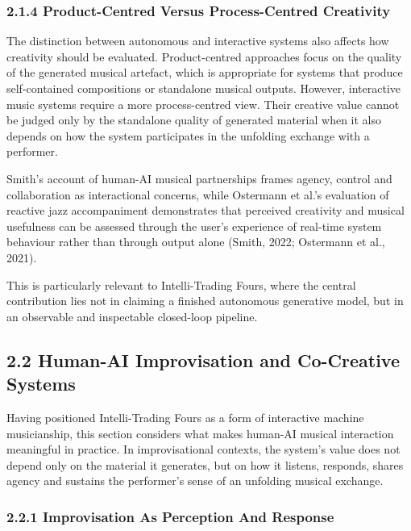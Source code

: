 \subsubsection{2.1.4 Product-Centred Versus Process-Centred
Creativity}\label{product-centred-versus-process-centred-creativity}

The distinction between autonomous and interactive systems also affects
how creativity should be evaluated. Product-centred approaches focus on
the quality of the generated musical artefact, which is appropriate for
systems that produce self-contained compositions or standalone musical
outputs. However, interactive music systems require a more
process-centred view. Their creative value cannot be judged only by the
standalone quality of generated material when it also depends on how the
system participates in the unfolding exchange with a performer.

Smith's account of human-AI musical partnerships frames agency, control
and collaboration as interactional concerns, while Ostermann et al.'s
evaluation of reactive jazz accompaniment demonstrates that perceived
creativity and musical usefulness can be assessed through the user's
experience of real-time system behaviour rather than through output
alone (Smith, 2022; Ostermann et al., 2021).

This is particularly relevant to Intelli-Trading Fours, where the
central contribution lies not in claiming a finished autonomous
generative model, but in an observable and inspectable closed-loop
pipeline.

\subsection{2.2 Human-AI Improvisation and Co-Creative
Systems}\label{human-ai-improvisation-and-co-creative-systems}

Having positioned Intelli-Trading Fours as a form of interactive machine
musicianship, this section considers what makes human-AI musical
interaction meaningful in practice. In improvisational contexts, the
system's value does not depend only on the material it generates, but on
how it listens, responds, shares agency and sustains the performer's
sense of an unfolding musical exchange.

\subsubsection{2.2.1 Improvisation As Perception And
Response}\label{improvisation-as-perception-and-response}

